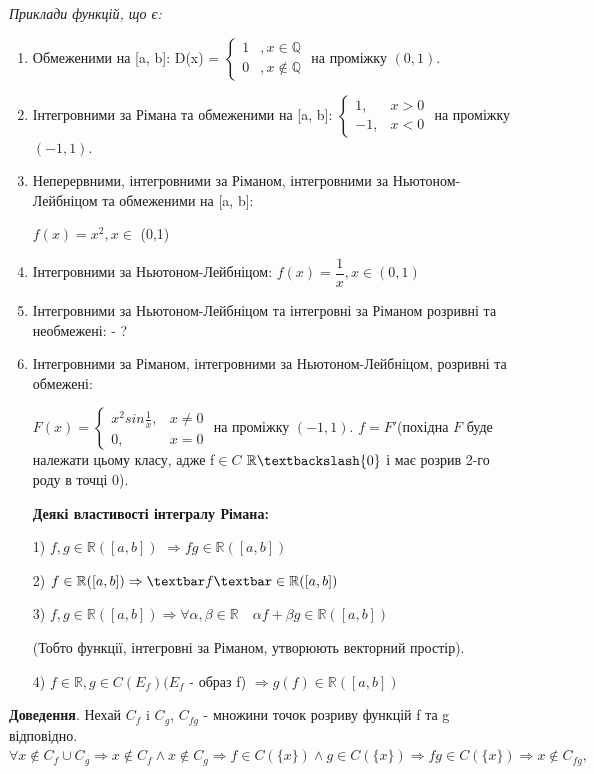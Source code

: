 \documentclass[12pt]{report}
\begin{document}
\textit{Приклади функцій, що є:}
	\begin{enumerate}	
	
	\item 	Обмеженими  на [a, b]:  D(x) = $\begin{cases} 1 &, x \in \mathbb{Q} \\ 0 &, x \notin \mathbb{Q} \end{cases}$ на проміжку $(0,1)$. 
	
	\item Інтегровними за Рімана та обмеженими  на [a, b]: $\begin{cases} 1, & x >0  \\ -1, & x <0 \end{cases}$ на проміжку $(-1,1)$. 
	
	\item Неперервними, інтегровними за Ріманом, інтегровними за Ньютоном-Лейбніцом та обмеженими на [a, b]:
	
	$ f(x) = x^2, x  \in $ (0,1)
	
	\item Інтегровними за Ньютоном-Лейбніцом: $ f(x) = \dfrac{1}{x}, x \in (0,1)$
	
	\item Інтегровними за Ньютоном-Лейбніцом та інтегровні за Ріманом розривні та необмежені: - ?
	
	\item 	Інтегровними за Ріманом, інтегровними за Ньютоном-Лейбніцом, розривні та обмежені:
	
	$  F(x) = \begin{cases} x^2sin\frac{1}{x}, & x \neq 0  \\ 0, & x =0 \end{cases}$ на
	 проміжку $(-1,1)$. 
	 $f = F'$(похідна $F $ буде належати цьому класу,  адже f$\in C $
   $\mathbb{R}\textbackslash \{0\}$ і має розрив 2-го роду в точці 0). 
   
   	\textbf{Деякі властивості інтегралу Рімана:}
   	
   	1)  $ f, g \in \mathbb{R}([a, b])$ $ \Rightarrow fg \in  \mathbb{R}([a, b])$
   	 
   	2)  $ f \in \mathbb{R}([a, b]) \Rightarrow \textbar f \textbar \in  \mathbb{R}([a, b]) $
   	
   	3) $f, g \in  \mathbb{R}([a, b]) \Rightarrow \forall \alpha, \beta \in \mathbb{R}
   \quad  	\alpha f + \beta g \in  \mathbb{R}([a, b])
   	 $
   	 
   	\footnotesize  {(Тобто функції, інтегровні за Ріманом, утворюють векторний простір).}
   	
   	4) $f \in \mathbb{R},    g \in C(E_f) (E_f$ - образ f) $\Rightarrow g(f) \in \mathbb{R}([a, b]) $
	\end{enumerate}	
			\textbf{Доведення}. Нехай $C_f$ i $ C_g $, $C_{fg}$ - множини точок розриву функцій f та g відповідно. $\forall x \notin C_f \cup C_g \Rightarrow x  \notin C_f \wedge x \notin C_g 
			\Rightarrow f \in C(\{x\})  \wedge  g \in  C(\{x\}) \Rightarrow  fg \in  C(\{x\}) \Rightarrow x  \notin C_{fg}, $
			
\end{document}
